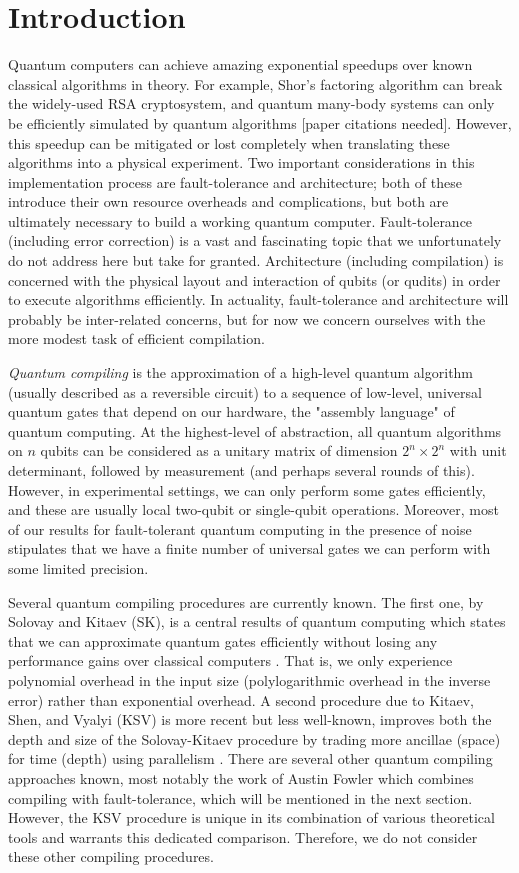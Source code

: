 \section{Introduction}

Quantum computers can achieve amazing exponential speedups over known classical
algorithms in theory. For example, Shor's factoring algorithm can break the
widely-used RSA cryptosystem, and quantum many-body systems can only be
efficiently simulated by quantum algorithms [paper citations needed].
However, this speedup can be mitigated or lost completely when translating
these algorithms into a physical experiment.
Two important considerations in this implementation process are fault-tolerance
and architecture; both of these introduce their own resource overheads and
complications, but both are ultimately necessary to build a working quantum
computer.
Fault-tolerance (including error correction) is a vast and fascinating topic
that we unfortunately do not address here but take for granted.
Architecture (including compilation) is
concerned with the physical layout and interaction of qubits (or qudits) in
order to execute algorithms efficiently. In actuality, fault-tolerance and
architecture will probably be inter-related concerns, but for now we concern 
ourselves with the more modest task of efficient compilation.

\emph{Quantum compiling} is the
approximation of a high-level quantum algorithm (usually described as a
reversible circuit) to a sequence
of low-level, universal quantum gates that depend on our hardware, the
"assembly language" of quantum computing.
At the highest-level of abstraction, all quantum algorithms on $n$ qubits
can be considered as a unitary matrix of dimension $2^n \times 2^n$ with
unit determinant, followed by measurement (and perhaps several rounds of this).
However, in experimental settings,
we can only perform some gates efficiently, and these are usually local
two-qubit or single-qubit operations.
Moreover, most of our results for fault-tolerant
quantum computing in the presence of noise stipulates that we have a finite
number of universal gates we can perform with some limited precision.

Several quantum compiling procedures are currently known. The first one,
by Solovay and Kitaev (SK),
is a central results of quantum computing which states that we
can approximate quantum gates efficiently without losing any performance
gains over classical computers  \cite{Dawson2005}. That is, we only experience polynomial
overhead in the input size (polylogarithmic overhead in the inverse error)
rather than exponential overhead.
A second procedure due to Kitaev, Shen, and Vyalyi (KSV) is more recent but
less well-known, improves
both the depth and size of the Solovay-Kitaev procedure by trading
more ancillae (space) for time (depth) using parallelism
\cite{ksv02}. There are several other quantum compiling approaches known,
most notably the work of Austin Fowler \cite{Fowler2004} which combines
compiling with fault-tolerance,
which will be mentioned in the next section.
However, the KSV procedure is unique in its combination of various theoretical
tools and warrants this dedicated comparison.
Therefore, we do not consider
these other compiling procedures.

